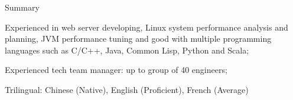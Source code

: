 \documentclass{resume} %
\begin{document}
\begin{rSection}{Summary}

\item Experienced in web server developing, Linux system performance analysis and planning, JVM performance tuning and good with multiple programming languages such as C/C++, Java, Common Lisp, Python and Scala;
\item Experienced tech team manager: up to group of 40 engineers;
\item Trilingual: Chinese (Native), English (Proficient), French (Average)

\end{rSection}





\end{document}
